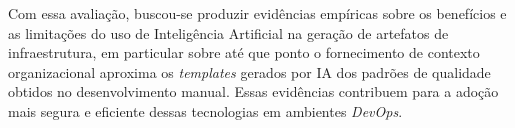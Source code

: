 Com essa avaliação, buscou-se produzir evidências empíricas sobre os benefícios e as limitações do uso de Inteligência Artificial na geração de artefatos de infraestrutura, em particular sobre até que ponto o fornecimento de contexto organizacional aproxima os \textit{templates} gerados por IA dos padrões de qualidade obtidos no desenvolvimento manual. Essas evidências contribuem para a adoção mais segura e eficiente dessas tecnologias em ambientes \textit{DevOps}.
